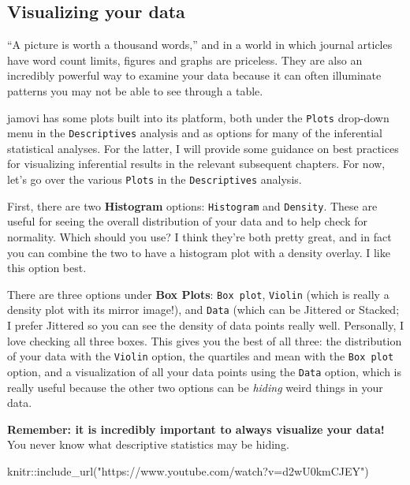 \documentclass[
]{book}
\newenvironment{Shaded}{\begin{snugshade}}{\end{snugshade}}
\newcommand{\FunctionTok}[1]{\textcolor[rgb]{0.00,0.00,0.00}{#1}}
\newcommand{\NormalTok}[1]{#1}
\newcommand{\SpecialCharTok}[1]{\textcolor[rgb]{0.00,0.00,0.00}{#1}}
\newcommand{\StringTok}[1]{\textcolor[rgb]{0.31,0.60,0.02}{#1}}
\begin{document}
\hypertarget{visualizing-your-data}{%
\subsection{Visualizing your data}\label{visualizing-your-data}}

``A picture is worth a thousand words,'' and in a world in which journal articles have word count limits, figures and graphs are priceless. They are also an incredibly powerful way to examine your data because it can often illuminate patterns you may not be able to see through a table.

jamovi has some plots built into its platform, both under the \texttt{Plots} drop-down menu in the \texttt{Descriptives} analysis and as options for many of the inferential statistical analyses. For the latter, I will provide some guidance on best practices for visualizing inferential results in the relevant subsequent chapters. For now, let's go over the various \texttt{Plots} in the \texttt{Descriptives} analysis.

First, there are two \textbf{Histogram} options: \texttt{Histogram} and \texttt{Density}. These are useful for seeing the overall distribution of your data and to help check for normality. Which should you use? I think they're both pretty great, and in fact you can combine the two to have a histogram plot with a density overlay. I like this option best.

There are three options under \textbf{Box Plots}: \texttt{Box\ plot}, \texttt{Violin} (which is really a density plot with its mirror image!), and \texttt{Data} (which can be Jittered or Stacked; I prefer Jittered so you can see the density of data points really well. Personally, I love checking all three boxes. This gives you the best of all three: the distribution of your data with the \texttt{Violin} option, the quartiles and mean with the \texttt{Box\ plot} option, and a visualization of all your data points using the \texttt{Data} option, which is really useful because the other two options can be \emph{hiding} weird things in your data.

\textbf{Remember: it is incredibly important to always visualize your data!} You never know what descriptive statistics may be hiding.

\begin{Shaded}
\begin{Highlighting}[]
\NormalTok{knitr}\SpecialCharTok{::}\FunctionTok{include\_url}\NormalTok{(}\StringTok{"https://www.youtube.com/watch?v=d2wU0kmCJEY"}\NormalTok{)}
\end{Highlighting}
\end{Shaded}
\end{document}
